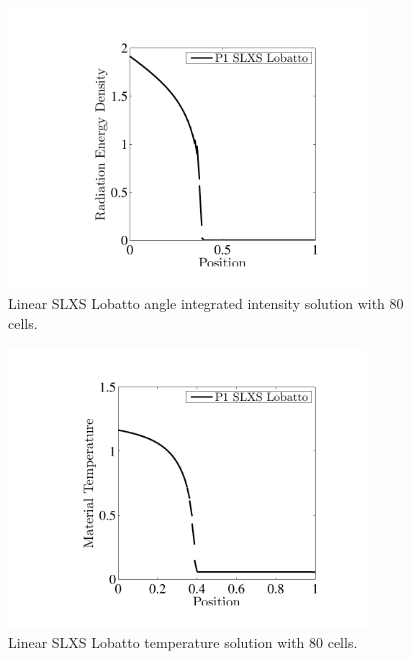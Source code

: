 %
\begin{figure}[!hbp]
\centering
\includegraphics[width=9.5cm,trim=1.2in  0.2in 0.75in 0.5in,clip=true]{chapter6_grey_radtran/Dissertation_Data/SLXS_Lobatto_80_Cells_Radiation.pdf}
\caption{Linear SLXS Lobatto angle integrated intensity solution with 80 cells.}
\label{fig:linear_slxs_full_rad}
\end{figure}
%
%
\begin{figure}[!htp]
\centering
\includegraphics[width=9.5cm,trim=1.2in  0.2in 0.75in 0.5in,clip=true]{chapter6_grey_radtran/Dissertation_Data/SLXS_Lobatto_80_Cells_Temperature.pdf}
\caption{Linear SLXS Lobatto temperature solution with 80 cells.}
\label{fig:linear_slxs_full_temp}
\end{figure}
%

